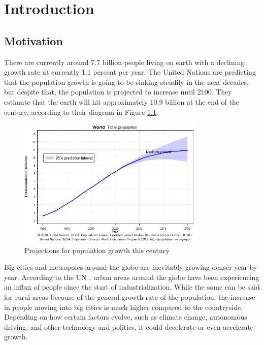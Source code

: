 
\chapter{Introduction}\label{chapter:introduction}
\section{Motivation}

There are currently around 7.7 billion people living on earth with a declining growth rate at currently 1.1 percent per year. The United Nations \cite{populationfacts} are predicting that the population growth is going to be sinking steadily in the next decades, but despite that, the population is projected to increase until 2100. They estimate that the earth will hit approximately 10.9 billion at the end of the century, according to their diagram in Figure \ref{fig:population}.

\begin{figure}[htpb]
  \centering
  \includegraphics[width=0.8\textwidth]{figures/population.png}
  \caption{Projections for population growth this century \cite{populationdata}}
  \label{fig:population}
\end{figure}

Big cities and metropoles around the globe are inevitably growing denser year by year. According to the UN \cite{populationdata}\cite{growth}, urban areas around the globe have been experiencing an influx of people since the start of industrialization. While the same can be said for rural areas because of the general growth rate of the population, the increase in people moving into big cities is much higher compared to the countryside.
Depending on how certain factors evolve, such as climate change, autonomous driving, and other technology and politics, it could decelerate or even accelerate growth.

